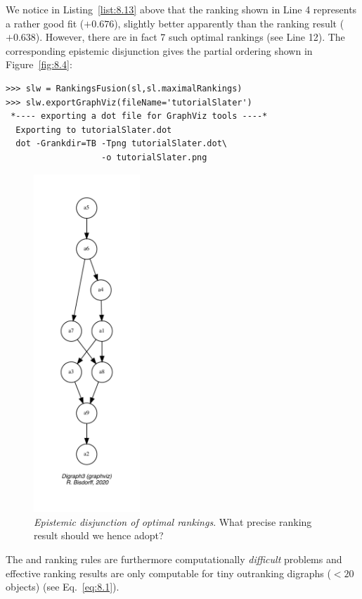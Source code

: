 We notice in Listing~\ref{list:8.13} above that the \Slater ranking shown in Line 4 represents a rather good fit ($+0.676$), slightly better apparently than the \NetFlows ranking result ($+0.638$). However, there are in fact 7 such optimal \Slater rankings (see Line 12). The corresponding epistemic disjunction gives the partial ordering shown in Figure~\vref{fig:8.4}:
\begin{lstlisting}[caption={Computing the epistemic disjunction of optimal \Slater rankings},label=list:8.14]   
>>> slw = RankingsFusion(sl,sl.maximalRankings)
>>> slw.exportGraphViz(fileName='tutorialSlater')
 *---- exporting a dot file for GraphViz tools ----*
  Exporting to tutorialSlater.dot
  dot -Grankdir=TB -Tpng tutorialSlater.dot\
                   -o tutorialSlater.png
\end{lstlisting}
\begin{figure}[ht]
\sidecaption[t]
\includegraphics[width=4cm]{Figures/8-4-tutorialSlater.pdf}
\caption[Epistemic disjunction of optimal \Slater rankings]{\emph{Epistemic disjunction of optimal \Slater rankings}. What precise \Slater ranking result should we hence adopt?}
\label{fig:8.4}       %
\end{figure}
       
The \Kemeny and \Slater ranking rules are furthermore computationally \emph{difficult} problems and effective ranking results are only computable for tiny outranking digraphs ($< 20$ objects) (see Eq.~\vref{eq:8.1}). 

